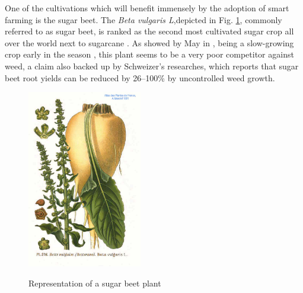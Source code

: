 One of the cultivations which will benefit immensely by the adoption of smart farming is the sugar beet. The \textit{Beta vulgaris L},depicted in Fig. \ref{fig:sugar_beet}, commonly referred to as sugar beet, is ranked as the second most cultivated  sugar crop all over the world next to sugarcane \cite{bhadra_weed_2020}. As showed by May in \cite{may_economic_2003}, being a slow-growing crop early in the season \cite{bhadra_weed_2020}, this plant seems to be a very poor competitor against weed, a claim also backed up by Schweizer's researches, which reports that sugar beet root yields can be reduced by 26–100\% by uncontrolled weed growth.  \cite{schweizer_weed_1989}\\
\begin{figure}[ht]
	\centering
	\includegraphics[width = 5cm]{img/276_Beta_vulgaris_L.jpg}
	\caption[Representation of a sugar beet plant]{Representation of a sugar beet plant \cite{masclef_sugar_1891} }{\centering}
	\label{fig:sugar_beet}
\end{figure}
